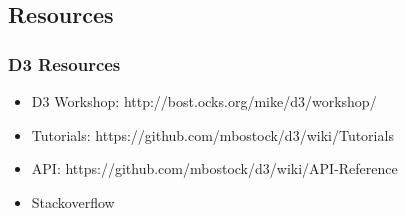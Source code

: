 \documentclass[red]{beamer}
\begin{document}
\subsection{Resources}
\begin{frame}
  \frametitle{D3 Resources}
  \begin{itemize}
  \item<1-> D3 Workshop: http://bost.ocks.org/mike/d3/workshop/
  \item<2-> Tutorials: https://github.com/mbostock/d3/wiki/Tutorials
  \item<3-> API: https://github.com/mbostock/d3/wiki/API-Reference
  \item<4-> Stackoverflow
  \end{itemize}
\end{frame}
\end{document}
